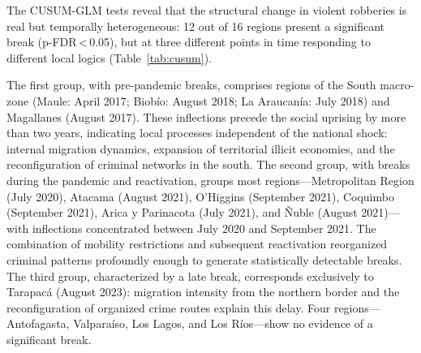 \documentclass[pdflatex,sn-basic]{sn-jnl}
\begin{document}
The CUSUM-GLM tests reveal that the structural change in violent robberies is real but
temporally heterogeneous: 12 out of 16 regions present a significant break
(p-FDR\,<\,0.05), but at three different points in time responding to different local
logics (Table~\ref{tab:cusum}).

The first group, with pre-pandemic breaks, comprises regions of the South macro-zone
(Maule: April 2017; Biob\'io: August 2018; La Araucan\'ia: July 2018) and Magallanes
(August 2017). These inflections precede the social uprising by more than two years,
indicating local processes independent of the national shock: internal migration dynamics,
expansion of territorial illicit economies, and the reconfiguration of criminal networks in the south.
The second group, with breaks during the pandemic and reactivation, groups most regions---Metropolitan
Region (July 2020), Atacama (August 2021), O'Higgins (September 2021), Coquimbo
(September 2021), Arica y Parinacota (July 2021), and \~Nuble (August 2021)---with
inflections concentrated between July 2020 and September 2021. The combination of
mobility restrictions and subsequent reactivation reorganized criminal patterns
profoundly enough to generate statistically detectable breaks.
The third group, characterized by a late break, corresponds exclusively to Tarapac\'a (August 2023):
migration intensity from the northern border and the reconfiguration of organized crime routes explain this delay.
Four regions---Antofagasta, Valpara\'iso, Los Lagos, and Los R\'ios---show no
evidence of a significant break.
\end{document}
